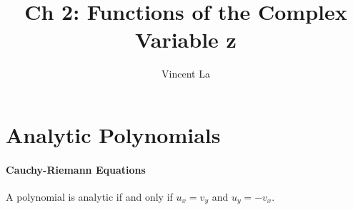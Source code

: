 \documentclass[]{article}
\title{Ch 2: Functions of the Complex Variable z}
\author{Vincent La}
\begin{document}
\maketitle

\section{Analytic Polynomials}
\paragraph{Cauchy-Riemann Equations} A polynomial is analytic if and only if $u_x = v_y$ and $u_y = -v_x$.
\end{document}
